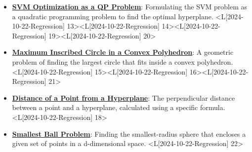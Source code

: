 \documentclass{article}%
\begin{document}
\begin{itemize}[[leftmargin=*]]
\item \href{https://www.math.purdue.edu/~yipn/421/2024-10-22-Regression.pdf#page=13}{\textbf{SVM Optimization as a QP Problem}}: Formulating the SVM problem as a quadratic programming problem to find the optimal hyperplane. <L[2024-10-22-Regression] 13><L[2024-10-22-Regression] 14><L[2024-10-22-Regression] 19><L[2024-10-22-Regression] 20>%
\item \href{https://www.math.purdue.edu/~yipn/421/2024-10-22-Regression.pdf#page=15}{\textbf{Maximum Inscribed Circle in a Convex Polyhedron}}: A geometric problem of finding the largest circle that fits inside a convex polyhedron. <L[2024-10-22-Regression] 15><L[2024-10-22-Regression] 16><L[2024-10-22-Regression] 21>%
\item \href{https://www.math.purdue.edu/~yipn/421/2024-10-22-Regression.pdf#page=18}{\textbf{Distance of a Point from a Hyperplane}}: The perpendicular distance between a point and a hyperplane, calculated using a specific formula. <L[2024-10-22-Regression] 18>%
\item \href{https://www.math.purdue.edu/~yipn/421/2024-10-22-Regression.pdf#page=22}{\textbf{Smallest Ball Problem}}: Finding the smallest-radius sphere that encloses a given set of points in a d-dimensional space. <L[2024-10-22-Regression] 22>%
\end{itemize}%
\end{document}
